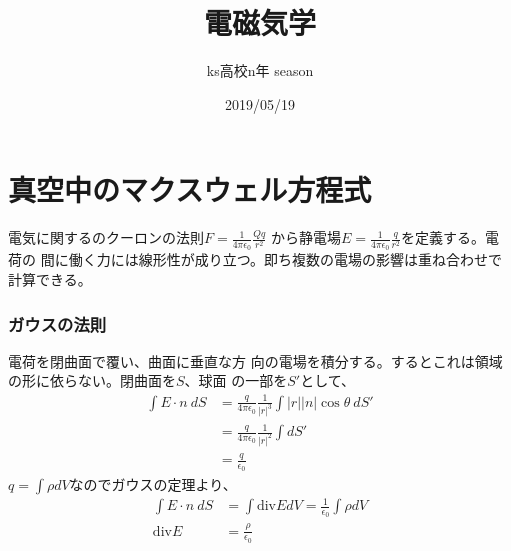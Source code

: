 \documentclass{jsarticle}
\begin{document}
\title{電磁気学}
\author{ks高校n年 season}
\date{2019/05/19}
\maketitle
\tableofcontents
\newcommand{\repart}[1]{\part{#1}\setcounter{section}{0}}
\newcommand{\lr}[1]{\left(#1 \right)}
\newcommand{\mlr}[1]{\left\{#1 \right\}}
\newcommand{\llr}[1]{\left[#1 \right]}
\newcommand{\na}[1]{\mathrm{#1}}
\newcommand{\rec}[1]{\frac{1}{#1}}
\newcommand{\de}[2][]{\frac{d #1}{d #2}}
\newcommand{\di}[2][]{\frac{d #1}{d #2}}
\newcommand{\dd}[2][]{\frac{d^2 #1}{d #2^2}}
\newcommand{\pd}[2][]{\frac{\partial #1}{\partial #2}}
\newcommand{\grad}{\mathrm{grad}}
\newcommand{\dive}{\mathrm{div}}
\newcommand{\rot}{\mathrm{rot}}
\repart{真空中のマクスウェル方程式}
    電気に関するのクーロンの法則$F=\rec{4\pi\epsilon_0}\frac{Qq}{r^2}$
    から静電場$E=\rec{4\pi\epsilon_0}\frac{q}{r^2}$を定義する。電荷の
    間に働く力には線形性が成り立つ。即ち複数の電場の影響は重ね合わせで計算できる。
    \section{ガウスの法則}
        電荷を閉曲面で覆い、曲面に垂直な方
        向の電場を積分する。するとこれは領域の形に依らない。閉曲面を$S$、球面
        の一部を$S'$として、
        \begin{align*}
            \int E\cdot n\ dS &= \frac{q}{4\pi\epsilon_0}
            \rec{|r|^3}\int |r||n|\cos\theta\ dS'\\
            &= \frac{q}{4\pi\epsilon_0}\rec{|r|^2}\int dS'\\
            &= \frac{q}{\epsilon_0}
        \end{align*}
        $q = \int \rho dV$なのでガウスの定理より、
        \begin{align*}
            \int E\cdot n\ dS &= \int \dive EdV = 
            \rec{\epsilon_0}\int \rho dV\\
            \dive E &= \frac{\rho}{\epsilon_0}
        \end{align*}
\end{document}
